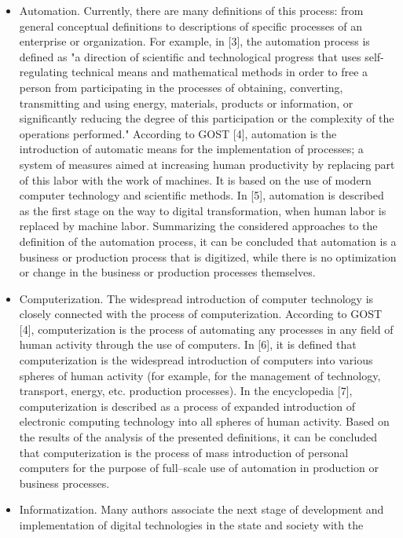 \documentclass{article}
\begin{document}
\begin{multicols}{2}
\begin{itemize}
\setlength\itemsep{-4.8pt}
    \item Automation. Currently, there are many definitions
of this process: from general conceptual definitions
to descriptions of specific processes of an enterprise
or organization. For example, in [3], the automation
process is defined as "a direction of scientific and
technological progress that uses self-regulating technical means and mathematical methods in order to
free a person from participating in the processes of
obtaining, converting, transmitting and using energy,
materials, products or information, or significantly
reducing the degree of this participation or the
complexity of the operations performed." According
to GOST [4], automation is the introduction of automatic means for the implementation of processes;
a system of measures aimed at increasing human
productivity by replacing part of this labor with the
work of machines. It is based on the use of modern
computer technology and scientific methods. In [5],
automation is described as the first stage on the
way to digital transformation, when human labor is
replaced by machine labor. Summarizing the considered approaches to the definition of the automation
process, it can be concluded that automation is
a business or production process that is digitized,
while there is no optimization or change in the
business or production processes themselves.
\item Computerization. The widespread introduction of
computer technology is closely connected with the
process of computerization. According to GOST [4],
computerization is the process of automating any
processes in any field of human activity through
the use of computers. In [6], it is defined that
computerization is the widespread introduction of
computers into various spheres of human activity
(for example, for the management of technology,
transport, energy, etc. production processes). In the
encyclopedia [7], computerization is described as
a process of expanded introduction of electronic
computing technology into all spheres of human
activity. Based on the results of the analysis of the
presented definitions, it can be concluded that computerization is the process of mass introduction of
personal computers for the purpose of full–scale use
of automation in production or business processes.
\item Informatization. Many authors associate the next
stage of development and implementation of digital technologies in the state and society with the

\end{itemize}
\end{multicols}
\end{document}
